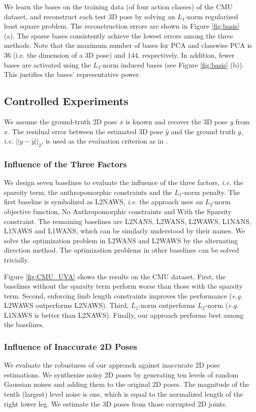\documentclass[10pt,twocolumn,letterpaper]{article}
\begin{document}
We learn the bases on the training data (of
four action classes) of the CMU dataset, and reconstruct each test
3D pose by solving an $L_1$-norm regularized least square problem.
The reconstruction errors are shown in Figure \ref{fig:basis} (a).
The sparse bases consistently achieve the
lowest errors among the three methods. Note that the maximum
number of bases for PCA and classwise PCA is $36$ (i.e. the
dimension of a 3D pose) and $144$, respectively. In addition,
fewer bases are activated using the $L_1$-norm induced bases (see Figure \ref{fig:basis}
(b)). This
justifies the bases' representative power.


\subsection{Controlled Experiments}
We assume the ground-truth 2D pose $x$ is known and recover the 3D pose
$y$ from $x$. The residual error between the estimated 3D pose
$\hat{y}$ and the ground truth $y$, {\em i.e.} $||y-\hat{y}||_2$, is
used as the evaluation criterion as in \cite{Ramakrishna}.

\subsubsection{Influence of the Three Factors}
\label{sec:threefactors} We design seven baselines to evaluate the
influence of the three factors, {\em i.e.} the sparsity term, the
anthropomorphic constraints and the $L_1$-norm penalty. The first
baseline is symbolized as L2NAWS, {\em i.e.} the approach uses an $L_2$-norm objective
function, No Anthropomorphic constraints and With the Sparsity
constraint. The remaining baselines are L2NANS, L2WANS, L2WAWS,
L1NANS, L1NAWS and L1WANS, which can be similarly understood by
their names. We solve the optimization problem in L2WANS and
L2WAWS by the alternating direction method. The optimization
problems in other baselines can be solved trivially.

Figure \ref{fig:CMU_UVA} shows the results on the CMU dataset.
First, the baselines without the sparsity term perform worse than
those with the sparsity term. Second, enforcing limb length constraints improves the
performance ({\it e.g.} L2WAWS outperforms L2NAWS). Third, $L_1$-norm
outperforms $L_2$-norm ({\it e.g.} L1NAWS is better than L2NAWS). Finally, our
approach performs best among the baselines.


\subsubsection{Influence of Inaccurate 2D Poses}
\label{sec:influenc_inaccurate} We evaluate the robustness of our
approach against inaccurate 2D pose estimations. We synthesize noisy 2D poses by generating ten
levels of random Gaussian noises and adding them to the original 2D poses. The
magnitude of the tenth (largest) level noise is one, which is equal to the normalized length of the right lower leg.
We estimate the 3D poses from those corrupted 2D joints.
\end{document}
